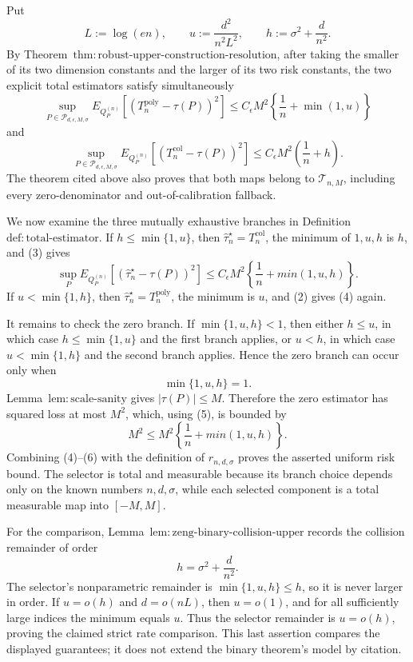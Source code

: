 Put
\[
 L:=\log(en),\qquad
 u:=\frac{d^2}{n^2L^2},\qquad
 h:=\sigma^2+\frac d{n^2}.
\tag{1}
\]
By Theorem~\(\mathrm{thm:robust\text{-}upper\text{-}construction\text{-}resolution}\), after taking the smaller of its two dimension constants and the larger of its two risk constants, the two explicit total estimators satisfy simultaneously
\[
 \sup_{P\in\mathcal P_{d,\epsilon,M,\sigma}}
 E_{Q_P^{(n)}}[(T_n^{\mathrm{poly}}-\tau(P))^2]
 \le C_{\epsilon}M^2\left\{\frac1n+\min(1,u)\right\}
\tag{2}
\]
and
\[
 \sup_{P\in\mathcal P_{d,\epsilon,M,\sigma}}
 E_{Q_P^{(n)}}[(T_n^{\mathrm{col}}-\tau(P))^2]
 \le C_{\epsilon}M^2\left(\frac1n+h\right).
\tag{3}
\]
The theorem cited above also proves that both maps belong to \(\mathcal T_{n,M}\), including every zero-denominator and out-of-calibration fallback.

We now examine the three mutually exhaustive branches in Definition~\(\mathrm{def:total\text{-}estimator}\).  If \(h\le\min\{1,u\}\), then \(\widehat\tau_n^{\star}=T_n^{\mathrm{col}}\), the minimum of \(1,u,h\) is \(h\), and (3) gives
\[
 \sup_P E_{Q_P^{(n)}}[(\widehat\tau_n^{\star}-\tau(P))^2]
 \le C_{\epsilon}M^2\left\{\frac1n+min(1,u,h)\right\}.
\tag{4}
\]
If \(u<\min\{1,h\}\), then \(\widehat\tau_n^{\star}=T_n^{\mathrm{poly}}\), the minimum is \(u\), and (2) gives (4) again.

It remains to check the zero branch.  If \(\min\{1,u,h\}<1\), then either \(h\le u\), in which case \(h\le\min\{1,u\}\) and the first branch applies, or \(u<h\), in which case \(u<\min\{1,h\}\) and the second branch applies.  Hence the zero branch can occur only when
\[
 \min\{1,u,h\}=1.
\tag{5}
\]
Lemma~\(\mathrm{lem:scale\text{-}sanity}\) gives \(|\tau(P)|\le M\).  Therefore the zero estimator has squared loss at most \(M^2\), which, using (5), is bounded by
\[
 M^2\le M^2\left\{\frac1n+min(1,u,h)\right\}.
\tag{6}
\]
Combining (4)--(6) with the definition of \(r_{n,d,\sigma}\) proves the asserted uniform risk bound.  The selector is total and measurable because its branch choice depends only on the known numbers \(n,d,\sigma\), while each selected component is a total measurable map into \([-M,M]\).

For the comparison, Lemma~\(\mathrm{lem:zeng\text{-}binary\text{-}collision\text{-}upper}\) records the collision remainder of order
\[
 h=\sigma^2+\frac d{n^2}.
\tag{7}
\]
The selector's nonparametric remainder is \(\min\{1,u,h\}\le h\), so it is never larger in order.  If \(u=o(h)\) and \(d=o(nL)\), then \(u=o(1)\), and for all sufficiently large indices the minimum equals \(u\).  Thus the selector remainder is \(u=o(h)\), proving the claimed strict rate comparison.  This last assertion compares the displayed guarantees; it does not extend the binary theorem's model by citation.